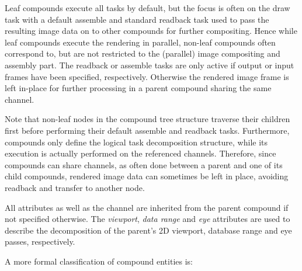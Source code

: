Leaf compounds execute all tasks by default, but the focus is often on the draw
task with a default assemble and standard readback task used to pass the
resulting image data on to other compounds for further compositing. Hence while
leaf compounds execute the rendering in parallel, non-leaf compounds often
correspond to, but are not restricted to the (parallel) image compositing and
assembly part. The readback or assemble tasks are only active if output or input
frames have been specified, respectively. Otherwise the rendered image frame is
left in-place for further processing in a parent compound sharing the same
channel.

Note that non-leaf nodes in the compound tree structure traverse their children
first before performing their default assemble and readback tasks. Furthermore,
compounds only define the logical task decomposition structure, while its
execution is actually performed on the referenced channels. Therefore, since
compounds can share channels, as often done between a parent and one of its
child compounds, rendered image data can sometimes be left in place, avoiding
readback and transfer to another node.

All attributes as well as the channel are inherited from the parent compound if
not specified otherwise. The {\em viewport}, {\em data range} and {\em eye}
attributes are used to describe the decomposition of the parent's 2D viewport,
database range and eye passes, respectively.

A more formal classification of compound entities is:

